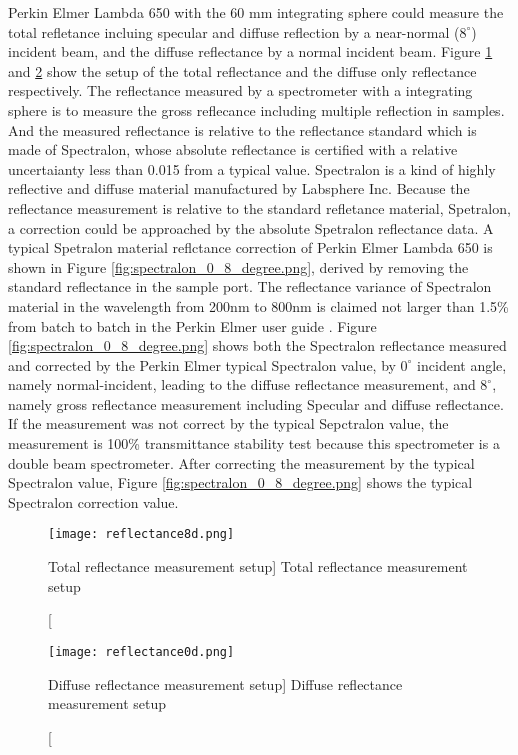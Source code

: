 Perkin Elmer Lambda 650 with the 60 mm integrating sphere could measure
the total refletance incluing specular and diffuse reflection by a near-normal ($8^\circ$) incident beam, and
the diffuse reflectance by a normal incident beam.
Figure \ref{fig:reflectance8d.png} and \ref{fig:reflectance0d.png} show the setup of the total reflectance and the diffuse only
reflectance respectively.
The reflectance measured by a spectrometer with a integrating sphere is to measure the gross reflecance including multiple reflection in samples.
And the measured reflectance is relative to the reflectance standard which is made of Spectralon, whose absolute reflectance is certified with
a relative uncertaianty less than 0.015 from a typical value. Spectralon is a kind of highly reflective and diffuse material manufactured by Labsphere Inc.
\cite{Labsphere}
Because the reflectance measurement is relative to the standard refletance material, Spetralon,
a correction could be approached by the absolute Spetralon reflectance data.
A typical Spetralon material reflctance correction of Perkin Elmer Lambda 650 is
shown in Figure \ref{fig:spectralon_0_8_degree.png}, derived by removing the standard
reflectance in the sample port. The reflectance variance of Spectralon material in the wavelength from 200nm to 800nm
is claimed not larger than 1.5\% from batch to batch
in the Perkin Elmer user guide \cite{SphereAccessories}.
Figure \ref{fig:spectralon_0_8_degree.png} shows both the Spectralon reflectance measured and corrected by the Perkin Elmer typical Spectralon value,
by $0^\circ$ incident angle, namely normal-incident, leading to the diffuse reflectance measurement,
and $8^\circ$, namely gross reflectance measurement including Specular and diffuse reflectance.
If the measurement was not correct by the typical Sepctralon value, the measurement is 100\% transmittance stability test
because this spectrometer is a double beam spectrometer.
After correcting the measurement by the typical Spectralon value, Figure \ref{fig:spectralon_0_8_degree.png} shows the typical Spectralon correction value.


\begin{figure}
    \centering
    \texttt{[image: reflectance8d.png]}
    \caption
    [Total reflectance measurement setup]
    {Total reflectance measurement setup}
    \label{fig:reflectance8d.png}
    \end{figure}


\begin{figure}
    \centering
    \texttt{[image: reflectance0d.png]}
    \caption
    [Diffuse reflectance measurement setup]
    {Diffuse reflectance measurement setup}
    \label{fig:reflectance0d.png}
    \end{figure}


